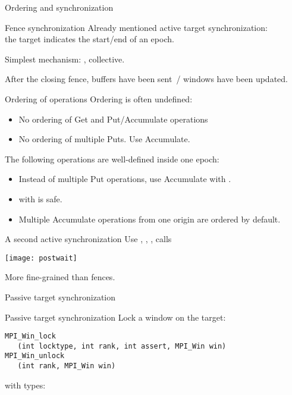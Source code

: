  {Ordering and synchronization}

\begin{numberedframe}{Fence synchronization}
  Already mentioned active target synchronization:\\
  the target indicates the start/end of an epoch.

  Simplest mechanism: , collective.  

  After the closing fence, buffers have been sent~/ windows have been updated.
\end{numberedframe}

\begin{numberedframe}{Ordering of operations}
  Ordering is often undefined:
  \begin{itemize}
  \item No ordering of Get and Put/Accumulate operations
  \item No ordering of multiple Puts. Use Accumulate.
  \end{itemize}
  The following operations are well-defined inside one epoch:
  \begin{itemize}
  \item Instead of multiple Put operations, use Accumulate with
    .
  \item {} with
     is safe.
  \item Multiple Accumulate operations from one origin are ordered by
    default.
  \end{itemize} 
\end{numberedframe}

\begin{optexerciseframe}[countdown]
  
\end{optexerciseframe}

\begin{numberedframe}{A second active synchronization}
  Use , ,
  ,  calls

  \texttt{[image: postwait]}

  More fine-grained than fences.
\end{numberedframe}

 {Passive target synchronization}

\begin{numberedframe}{Passive target synchronization}
  Lock a window on the target:
\lstset{language=C}
\begin{lstlisting}
MPI_Win_lock
   (int locktype, int rank, int assert, MPI_Win win)
MPI_Win_unlock
   (int rank, MPI_Win win)
\end{lstlisting}
  with types:   
\end{numberedframe}

\endinput

\begin{numberedframe}{}
\begin{lstlisting}
  
\end{lstlisting}
\end{numberedframe}


